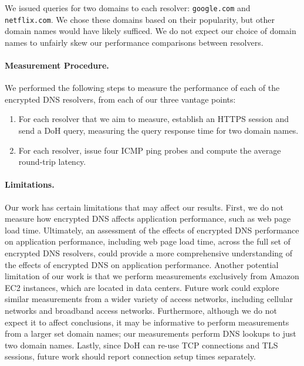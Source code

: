 We issued queries for two domains to each resolver: \texttt{google.com} and
\texttt{netflix.com}.  We chose these domains based on their popularity, but
other domain names would have likely sufficed.  We do not expect our choice of
domain names to unfairly skew our performance comparisons between resolvers.

\paragraph{Measurement Procedure.} We performed the following steps to measure
the performance of each of the encrypted DNS resolvers, from each of our three vantage points:
\begin{enumerate} 
        \item For each
            resolver that we aim to measure, establish an HTTPS session and
            send a DoH query, measuring the query response time for two
            domain names.
    \item For each resolver, issue four ICMP ping
            probes and compute the average round-trip latency. 
\end{enumerate}

\paragraph{Limitations.} Our work has certain limitations that may affect our
results.  First, we do not measure how encrypted DNS affects application
performance, such as web page load time. Ultimately, an assessment of the
effects of encrypted DNS performance on application performance, including web
page load time, across the full set of encrypted DNS resolvers, could provide
a more comprehensive understanding of the effects of encrypted DNS on
application performance.  Another potential limitation of our work is that we
perform measurements exclusively from Amazon EC2 instances, which are located
in data centers. Future work could explore similar measurements from a wider
variety of access networks, including cellular networks and broadband access
networks.  Furthermore, although we do not expect it to affect conclusions, it may
be informative to perform measurements from a larger set domain names; our
measurements perform DNS lookups to just two domain names.
Lastly, since DoH can re-use TCP connections and TLS sessions, future work 
should report connection setup times separately.
